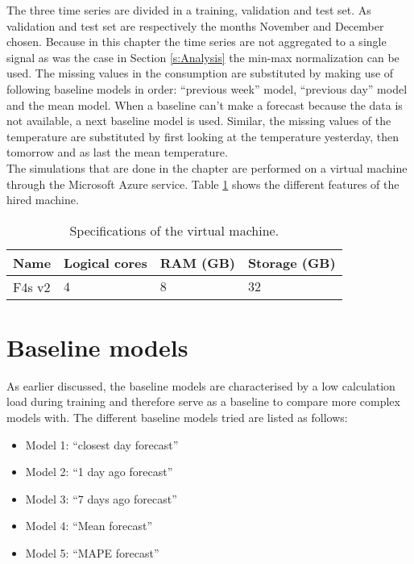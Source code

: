 The three time series are divided in a training, validation and test set. As validation and test set are respectively the months November and December chosen. Because in this chapter the time series are not aggregated to a single signal as was the case in Section \ref{s:Analysis} the min-max normalization can be used. The missing values in the consumption are substituted by making use of following baseline models in order: ``previous week'' model, ``previous day'' model and the mean model. When a baseline can't make a forecast because the data is not available, a next baseline model is used. Similar, the missing values of the temperature are substituted by first looking at the temperature yesterday, then tomorrow and as last the mean temperature.\\

The simulations that are done in the chapter are performed on a virtual machine through the Microsoft Azure service.
Table \ref{tab:CPU} shows the different features of the hired machine. 
\begin{table}[hb]
	\centering
	\begin{tabular}{|p{2cm}|p{2cm}|p{2cm}|p{2cm}|}\hline
		\textbf{Name}	& \textbf{Logical cores} & \textbf{RAM (GB)} & \textbf{Storage (GB)}\\\hline
		F4s v2& $ 4 $&$ 8 $  & $ 32 $ \\\hline
	\end{tabular}
	\caption{Specifications of the virtual machine.}
	\label{tab:CPU}
\end{table}


\section{Baseline models}\label{s:Baseline models}
As earlier discussed, the baseline models are characterised by a low calculation load during training and therefore serve as a baseline to compare more complex models with. The different baseline models tried are listed as follows:
\begin{itemize}
	\item Model 1: ``closest day forecast''
	\item Model 2: ``1 day ago forecast''
	\item Model 3: ``7 days ago forecast''
	\item Model 4: ``Mean forecast''
	\item Model 5: ``MAPE forecast''
\end{itemize} 

